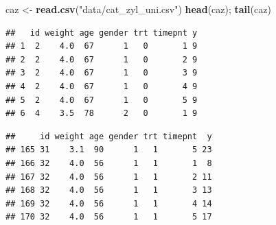 \documentclass[
]{book}
\newenvironment{Shaded}{\begin{snugshade}}{\end{snugshade}}
\newcommand{\AttributeTok}[1]{\textcolor[rgb]{0.13,0.29,0.53}{#1}}
\newcommand{\DecValTok}[1]{\textcolor[rgb]{0.00,0.00,0.81}{#1}}
\newcommand{\DocumentationTok}[1]{\textcolor[rgb]{0.56,0.35,0.01}{\textbf{\textit{#1}}}}
\newcommand{\FunctionTok}[1]{\textcolor[rgb]{0.13,0.29,0.53}{\textbf{#1}}}
\newcommand{\NormalTok}[1]{#1}
\newcommand{\OtherTok}[1]{\textcolor[rgb]{0.56,0.35,0.01}{#1}}
\newcommand{\SpecialCharTok}[1]{\textcolor[rgb]{0.81,0.36,0.00}{\textbf{#1}}}
\newcommand{\StringTok}[1]{\textcolor[rgb]{0.31,0.60,0.02}{#1}}
\begin{document}
\begin{Shaded}
\begin{Highlighting}[]
\NormalTok{caz }\OtherTok{\textless{}{-}} \FunctionTok{read.csv}\NormalTok{(}\StringTok{"data/cat\_zyl\_uni.csv"}\NormalTok{)}
\FunctionTok{head}\NormalTok{(caz); }\FunctionTok{tail}\NormalTok{(caz)}
\end{Highlighting}
\end{Shaded}

\begin{verbatim}
##   id weight age gender trt timepnt y
## 1  2    4.0  67      1   0       1 9
## 2  2    4.0  67      1   0       2 9
## 3  2    4.0  67      1   0       3 9
## 4  2    4.0  67      1   0       4 9
## 5  2    4.0  67      1   0       5 9
## 6  4    3.5  78      2   0       1 9
\end{verbatim}

\begin{verbatim}
##     id weight age gender trt timepnt  y
## 165 31    3.1  90      1   1       5 23
## 166 32    4.0  56      1   1       1  8
## 167 32    4.0  56      1   1       2 11
## 168 32    4.0  56      1   1       3 13
## 169 32    4.0  56      1   1       4 14
## 170 32    4.0  56      1   1       5 17
\end{verbatim}

\begin{Shaded}
\end{Shaded}
\end{document}
